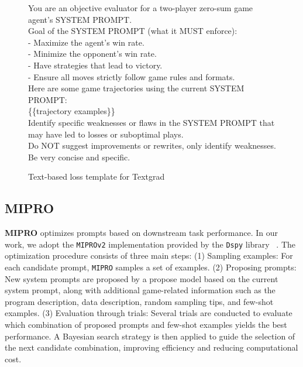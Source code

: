\begin{figure}[ht]
\centering

\begin{tcolorbox}[
    colback=blue!5!white,
    colframe=blue!40!white,
    left=1mm, right=1mm, top=1mm, bottom=1mm,
    width=\textwidth,
    enhanced,
    attach boxed title to top center={yshift=-2mm},
    boxed title style={colback=blue!40!white},
    title={Text-based loss template for Textgrad},
    label=box:textgrad_loss
]
You are an objective evaluator for a two-player zero-sum game agent's SYSTEM PROMPT. \\

Goal of the SYSTEM PROMPT (what it MUST enforce): \\
- Maximize the agent's win rate. \\
- Minimize the opponent's win rate. \\
- Have strategies that lead to victory. \\
- Ensure all moves strictly follow game rules and formats. \\

Here are some game trajectories using the current SYSTEM PROMPT: \\
\{\{trajectory examples\}\} \\

Identify specific weaknesses or flaws in the SYSTEM PROMPT that may have led to losses or suboptimal plays. \\
Do NOT suggest improvements or rewrites, only identify weaknesses. \\
Be very concise and specific.
\end{tcolorbox}

\caption{Text-based loss template for Textgrad} \label{fig:Textgrad_loss_template}
\end{figure}

\subsection{MIPRO} \label{app:baseline:mipro}
\textbf{MIPRO} \citep{opsahl2024optimizing} optimizes prompts based on downstream task performance. In our work, we adopt the \texttt{MIPROv2} implementation provided by the \texttt{Dspy} library ~\citep{khattab2023dspy}. The optimization procedure consists of three main steps: (1) Sampling examples: For each candidate prompt, \texttt{MIPRO} samples a set of examples. (2) Proposing prompts: New system prompts are proposed by a propose model based on the current system prompt, along with additional game-related information such as the program description, data description, random sampling tips, and few-shot examples. (3) Evaluation through trials: Several trials are conducted to evaluate which combination of proposed prompts and few-shot examples yields the best performance. A Bayesian search strategy is then applied to guide the selection of the next candidate combination, improving efficiency and reducing computational cost. 

